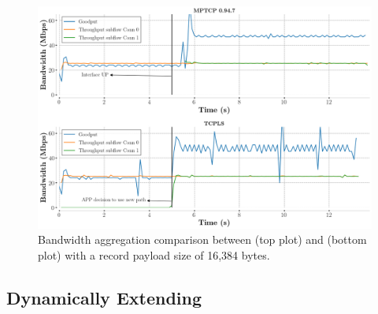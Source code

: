 
\begin{figure}[!t]
	\begin{center}
		\includegraphics[width=\columnwidth]{figures/aggregate_dual.png}
	\end{center}
	\caption{Bandwidth aggregation comparison between \mptcp (top plot) and
		\tcpls (bottom plot) with a record payload size of 16,384 bytes.}
	\label{fig:multipath_aggregation}
\end{figure}

\subsection{Dynamically Extending \tcpls}
%

